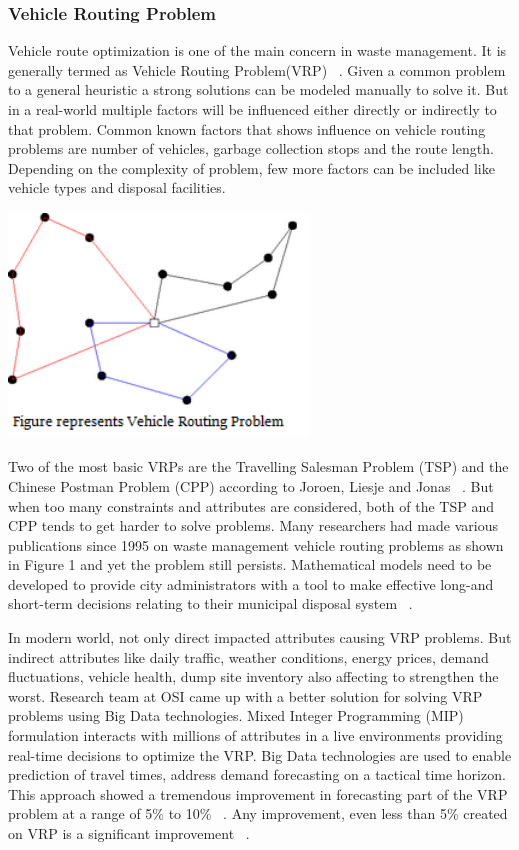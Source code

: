 \documentclass[sigconf]{acmart}
\begin{document}
\subsubsection{Vehicle Routing Problem}
Vehicle route optimization is one of the main concern in waste management. It is generally termed as Vehicle Routing Problem(VRP) ~\cite{Dantzig1959}. Given a common problem to a general heuristic a strong solutions can be modeled manually to solve it. But in a real-world multiple factors will be influenced either directly or indirectly to that problem. Common known factors that shows influence on vehicle routing problems are number of vehicles, garbage collection stops and the route length. Depending on the complexity of problem, few more factors can be included like vehicle types and disposal facilities. 

\includegraphics[width=8cm, height=6cm]{vrp}


Two of the most basic VRPs are the Travelling Salesman Problem (TSP) and the Chinese Postman Problem (CPP) according to Joroen, Liesje and Jonas ~\cite{Beliën2012}. But when too many constraints and attributes are considered, both of the TSP and CPP tends to get harder to solve problems. Many researchers had made various publications since 1995 on waste management vehicle routing problems as shown in Figure 1 and yet the problem still persists. Mathematical models need to be developed to provide city administrators with a tool to make effective long-and short-term decisions relating to their municipal disposal system ~\cite{Bhat1996}. 

In modern world, not only direct impacted attributes causing VRP problems. But indirect attributes like daily traffic, weather conditions, energy prices, demand fluctuations, vehicle health, dump site inventory also affecting to strengthen the worst. Research team at OSI came up with a better solution for solving VRP problems using Big Data technologies. Mixed Integer Programming (MIP) formulation interacts with millions of attributes in a live environments providing real-time decisions to optimize the VRP. Big Data technologies are used to enable prediction of travel times, address demand forecasting on a tactical time horizon. This approach showed a tremendous improvement in forecasting part of the VRP problem at a range of 5\% to 10\% ~\cite{vijay2013}. Any improvement, even less than 5\% created on VRP is a significant improvement ~\cite{Hasle2007}.
\end{document}

